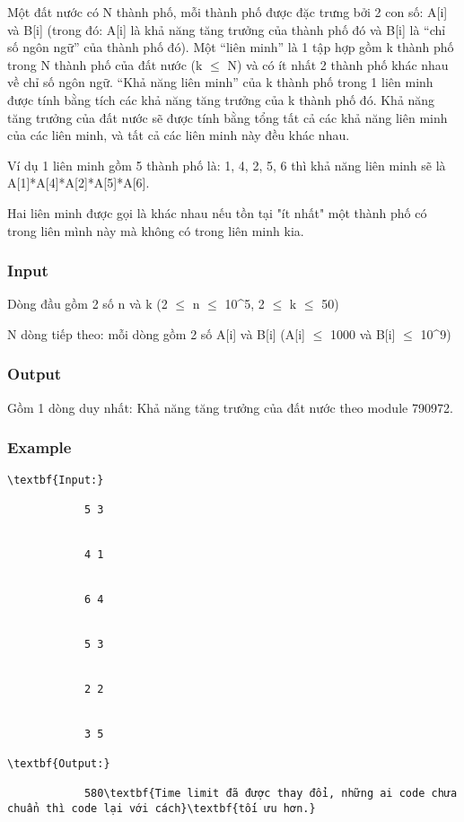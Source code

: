 



    Một đất nước có N thành phố, mỗi thành phố được đặc trưng bởi 2 con số: A[i] và B[i] (trong đó: A[i] là khả năng tăng trưởng của thành phố đó và B[i] là “chỉ số ngôn ngữ” của thành phố đó). Một “liên minh” là 1 tập hợp gồm k thành phố trong N thành phố của đất nước (k  $\le$  N) và có ít nhất 2 thành phố khác nhau về chỉ số ngôn ngữ. “Khả năng liên minh” của k thành phố trong 1 liên minh được tính bằng tích các khả năng tăng trưởng của k thành phố đó. Khả năng tăng trưởng của đất nước sẽ được tính bằng tổng tất cả các khả năng liên minh của các liên minh, và tất cả các liên minh này đều khác nhau.   



    Ví dụ 1 liên minh gồm 5 thành phố là: 1, 4, 2, 5, 6 thì khả năng liên minh sẽ là A[1]*A[4]*A[2]*A[5]*A[6].   



    Hai liên minh được gọi là khác nhau nếu tồn tại "ít nhất" một thành phố có trong liên mình này mà không có trong liên minh kia.   

\subsubsection{   Input  }



    Dòng đầu gồm 2 số n và k (2 $\le$  n  $\le$  10\textasciicircum5, 2  $\le$  k  $\le$  50)   



    N dòng tiếp theo: mỗi dòng gồm 2 số A[i] và B[i] (A[i]  $\le$  1000 và B[i]  $\le$  10\textasciicircum9)   

\subsubsection{   Output  }

    Gồm 1 dòng duy nhất: Khả năng tăng trưởng của đất nước theo module 790972.   

\subsubsection{    Example   }
\begin{verbatim}
\textbf{Input:}

            5 3


            4 1


            6 4


            5 3


            2 2


            3 5

\textbf{Output:}

            580\textbf{Time limit đã được thay đổi, những ai code chưa chuẩn thì code lại với cách}\textbf{tối ưu hơn.}\end{verbatim}
